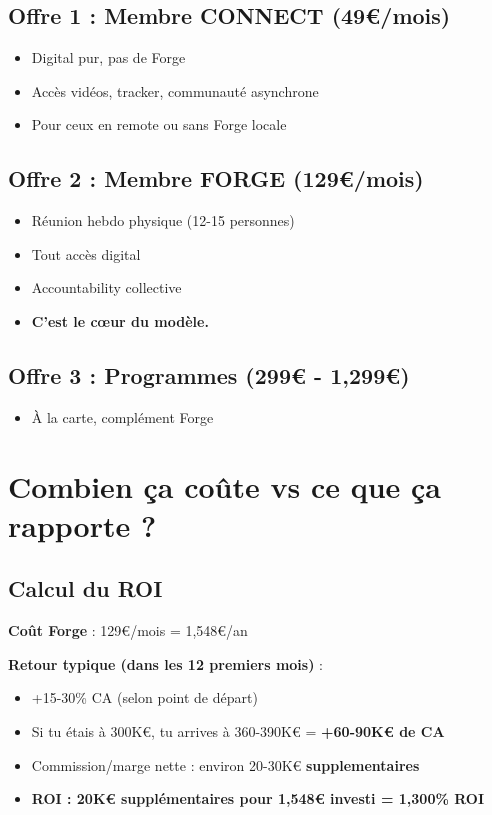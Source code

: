 \documentclass[12pt,a4paper,openany]{book}
\begin{document}
\subsection{Offre 1 : Membre CONNECT (49\euro{}/mois)}

\begin{itemize}
\item Digital pur, pas de Forge
\item Accès vidéos, tracker, communauté asynchrone
\item Pour ceux en remote ou sans Forge locale
\end{itemize}

\subsection{Offre 2 : Membre FORGE (129\euro{}/mois)}

\begin{itemize}
\item Réunion hebdo physique (12-15 personnes)
\item Tout accès digital
\item Accountability collective
\item \textbf{C'est le cœur du modèle.}
\end{itemize}

\subsection{Offre 3 : Programmes (299\euro{} - 1,299\euro{})}

\begin{itemize}
\item À la carte, complément Forge
\end{itemize}

\section{Combien ça coûte vs ce que ça rapporte ?}

\subsection{Calcul du ROI}

\textbf{Coût Forge} : 129\euro{}/mois = 1,548\euro{}/an

\textbf{Retour typique (dans les 12 premiers mois)} :
\begin{itemize}
\item +15-30\% CA (selon point de départ)
\item Si tu étais à 300K\euro{}, tu arrives à 360-390K\euro{} = \textbf{+60-90K\euro{} de CA}
\item Commission/marge nette : environ 20-30K\euro{} \textbf{supplementaires}
\item \textbf{ROI : 20K\euro{} supplémentaires pour 1,548\euro{} investi = 1,300\% ROI}
\end{itemize}
\end{document}
